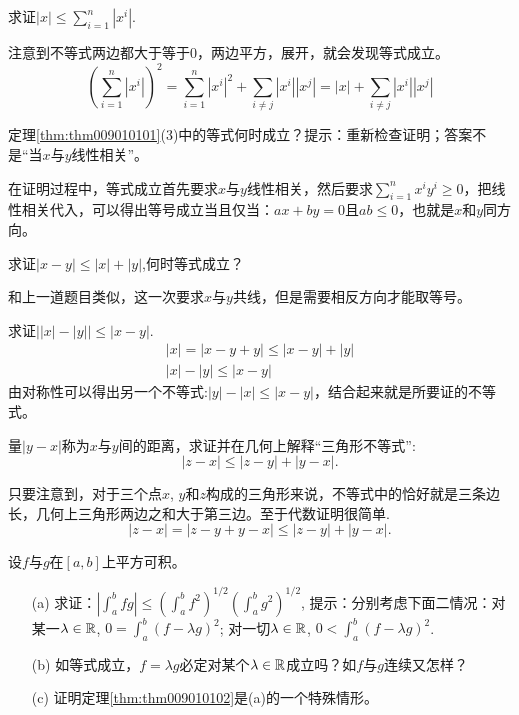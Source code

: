 \begin{problemset}
\item 求证$|x| \le \sum\limits_{i=1}^{n}{|x^i|}$.

注意到不等式两边都大于等于0，两边平方，展开，就会发现等式成立。
\[
(\sum_{i=1}^{n}{|x^i|})^2 = \sum_{i=1}^{n}{|x^i|^2} + \sum_{i \neq j}{|x^i||x^j|} = |x| + \sum_{i \neq j}{|x^i||x^j|}
\]

\item 定理\ref{thm:thm009010101}(3)中的等式何时成立？提示：重新检查证明；答案不是“当$x$与$y$线性相关”。

在证明过程中，等式成立首先要求$x$与$y$线性相关，然后要求$\sum_{i=1}^{n}{x^iy^i} \ge 0$，把线性相关代入，可以得出等号成立当且仅当：$ax+by=0$且$ab \le 0$，也就是$x$和$y$同方向。

\item 求证$|x-y| \le |x| + |y|$,何时等式成立？

和上一道题目类似，这一次要求$x$与$y$共线，但是需要相反方向才能取等号。

\item 求证$\left||x|-|y|\right| \le |x-y|$.
\begin{gather*}
|x| = |x-y+y| \le |x-y|+|y|\\
|x| - |y| \le |x-y|
\end{gather*}
由对称性可以得出另一个不等式:$|y|-|x| \le |x-y|$，结合起来就是所要证的不等式。

\item 量$|y-x|$称为$x$与$y$间的距离，求证并在几何上解释“三角形不等式”:
\[
|z-x| \le |z-y| + |y-x|.
\]

只要注意到，对于三个点$x$, $y$和$z$构成的三角形来说，不等式中的恰好就是三条边长，几何上三角形两边之和大于第三边。至于代数证明很简单.
\[
|z-x| = |z-y + y-x| \le |z-y| + |y-x|.
\]

\item 设$f$与$g$在$[a,b]$上平方可积。
\begin{enumerate}
\item[(a)]求证：$\left|\int_{a}^{b}{fg}\right| \le \left(\int_{a}^{b}{f^2}\right)^{1/2}\left(\int_{a}^{b}{g^2}\right)^{1/2}$, 提示：分别考虑下面二情况：对某一$\lambda \in\mathbb{R}$, $0 = \int_{a}^{b}{(f - \lambda{}g)^2}$; 对一切$\lambda \in \mathbb{R}$, $0 < \int_{a}^{b}{(f - \lambda{}g)^2}$.

\item[(b)]如等式成立，$f = \lambda{}g$必定对某个$\lambda \in \mathbb{R}$成立吗？如$f$与$g$连续又怎样？

\item[(c)]证明定理\ref{thm:thm009010102}是(a)的一个特殊情形。
\end{enumerate}


\end{problemset}
